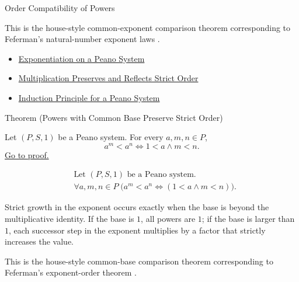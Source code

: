 \begin{topicbox}{Order Compatibility of Powers}
\begin{remark*}
This is the house-style common-exponent comparison theorem corresponding to
Feferman's natural-number exponent laws \citep{FefermanNumberSystems1964}.
\end{remark*}

\begin{dependencies}
\begin{itemize}
  \item \hyperref[def:exponentiation-on-peano-system]{Exponentiation on a Peano System}
  \item \hyperref[thm:multiplication-preserves-and-reflects-strict-order]{Multiplication Preserves and Reflects Strict Order}
  \item \hyperref[thm:induction-principle-for-peano-system]{Induction Principle for a Peano System}
\end{itemize}
\end{dependencies}

\begin{theorembox}{Theorem (Powers with Common Base Preserve Strict Order)}
\begin{theorem}
\label{thm:powers-with-common-base-preserve-strict-order}
Let $(P,S,1)$ be a Peano system. For every $a,m,n \in P$,
\[
a^m<a^n
\Longleftrightarrow
1<a \land m<n.
\]
\hyperref[prf:powers-with-common-base-preserve-strict-order]{Go to proof.}
\end{theorem}
\end{theorembox}

\begin{remark*}
\[
\begin{aligned}
&\text{Let } (P,S,1) \text{ be a Peano system.}\\
&\forall a,m,n \in P\;\bigl(a^m<a^n \Longleftrightarrow (1<a \land m<n)\bigr).
\end{aligned}
\]
\end{remark*}

\begin{remark*}[Interpretation]
Strict growth in the exponent occurs exactly when the base is beyond the
multiplicative identity. If the base is $1$, all powers are $1$; if the base
is larger than $1$, each successor step in the exponent multiplies by a factor
that strictly increases the value.
\end{remark*}

\begin{remark*}
This is the house-style common-base comparison theorem corresponding to
Feferman's exponent-order theorem \citep{FefermanNumberSystems1964}.
\end{remark*}


\end{topicbox}
